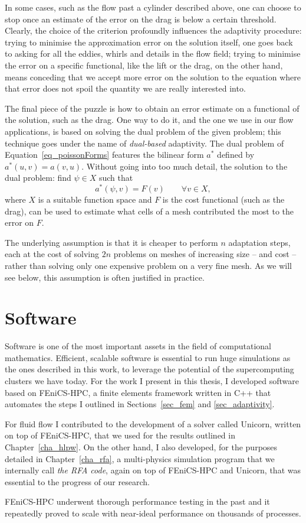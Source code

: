 In some cases, such as the flow past a cylinder described above, one can
choose to stop once an estimate of the error on the drag is below a
certain threshold.
Clearly, the choice of the criterion profoundly influences
the adaptivity procedure: trying to minimise the approximation error on
the solution itself, one goes back to asking for all the eddies, whirls
and details in the flow field; trying to minimise the error on a specific
functional, like the lift or the drag, on the other hand, means conceding
that we accept more error on the solution to the equation where that
error does not spoil the quantity we are really interested into.

The final piece of the puzzle is how to obtain an error estimate on a
functional of the solution, such as the drag.
One way to do it, and the one we use in our flow applications, is based
on solving the dual problem of the given problem; this technique goes under the
name of \emph{dual-based} adaptivity.
The dual problem of Equation~\eqref{eq_poissonForms} features the
bilinear form \(a^*\) defined by \(a^*(u, v) = a(v, u)\).
Without going into too much detail, the solution to the dual problem:
find \(\psi \in X\) such that
\begin{equation}
  a^*(\psi, v) = F(v) \qquad \forall v \in X,
  \label{eq_poissonDual}
\end{equation}
where \(X\) is a suitable function space and \(F\) is the cost functional
(such as the drag), can be used to estimate what cells of a mesh
contributed the most to the error on \(F\).

The underlying assumption is that it is cheaper to perform \(n\)
adaptation steps, each at the cost of solving \(2n\) problems on meshes of
increasing size -- and cost -- rather than solving only one expensive
problem on a very fine mesh.
As we will see below, this assumption is often justified in practice.

\section{Software}
\label{sec_software}
Software is one of the most important assets in the field of computational mathematics.
Efficient, scalable software is essential to run huge simulations as the ones described in this work, to leverage the potential of the supercomputing clusters we have today.
For the work I present in this thesis, I developed software based on FEniCS-HPC, a finite elements framework written in C++ that automates the steps I outlined in Sections~\ref{sec_fem} and \ref{sec_adaptivity}.

For fluid flow I contributed to the development of a solver called Unicorn, written on top of FEniCS-HPC, that we used for the results outlined in Chapter~\ref{cha_hlpw}.
On the other hand, I also developed, for the purposes detailed in Chapter~\ref{cha_rfa}, a multi-physics simulation program that we internally call \emph{the RFA code}, again on top of FEniCS-HPC and Unicorn, that was essential to the progress of our research.

FEniCS-HPC underwent thorough performance testing in the past and it repeatedly proved to scale with near-ideal performance on thousands of processes.
